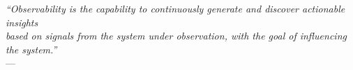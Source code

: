 \begin{epigrafe}
    \vspace*{\fill}
	\begin{flushright}
		\textit{``Observability is the capability to continuously generate and discover actionable insights\\
		based on signals from the system under observation, with the goal of influencing the system.''}\\
		\vspace{0.5cm}
		--- 
	\end{flushright}
\end{epigrafe}
